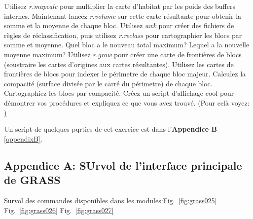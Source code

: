 Utilisez \textit{r.mapcalc} pour multiplier la carte d'habitat par les poids des buffers internes.
Maintenant lancez \textit{r.volume }sur cette carte r\'esultante pour obtenir la somme et la moyenne de chaque bloc.
Utilisez  \textit{awk} pour cr\'eer des fichiers de r\`egles de r\'eclassification, puis utilisez \textit{r.reclass} pour cartographier les blocs par somme et moyenne.
Quel bloc a le nouveau total maximum? Lequel a la nouvelle moyenne maximum?
Utilisez \textit{r.grow} pour cr\'eer une carte de fronti\`eres de blocs (soustraire les cartes d'origines aux cartes r\'esultantes).
Utilisez les cartes de fronti\`eres de blocs pour indexer le p\'erimetre de chaque bloc majeur. 
Calculez la compacit\'e (surface divis\'ee par le carr\'e du p\'erimetre) de chaque bloc. 
Cartographiez les blocs par compacit\'e. Cr\'eez un script d'affichage cool pour d\'emontrer vos proc\'edures et expliquez ce que vous avez trouv\'e.
(Pour cel\`a voyez: \href{http://www.udel.edu/johnmack/frec682/script_ideas.html})

Un script de quelques pqrties de cet exercice est dans l'\textbf{Appendice B} \ref{appendixB}.

\newpage

\subsection{Appendice A: SUrvol de l'interface principale de GRASS}
\label{appendixA}

Survol des commandes disponibles dans les modules:Fig.~\ref{fig:grass025} Fig.~\ref{fig:grass026} Fig.~\ref{fig:grass027}

